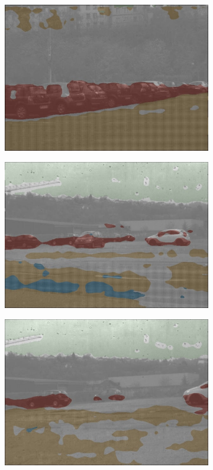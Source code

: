 \begin{figure}[h]
\begin{subfigure}[b]{0.18\linewidth}
		\includegraphics[width=\linewidth]{Figures/Aug/NA2/selected_images/overlayed/over4981.jpg}
	\end{subfigure}
	\begin{subfigure}[b]{0.18\linewidth}   
		\centering 
		\includegraphics[width=\linewidth]{Figures/Aug/NA2/selected_images/overlayed/over5142.jpg}
	\end{subfigure}
	\begin{subfigure}[b]{0.18\linewidth}   
		\centering 
		\includegraphics[width=\linewidth]{Figures/Aug/NA2/selected_images/overlayed/over5426.jpg}

\end{subfigure}
\end{figure}
